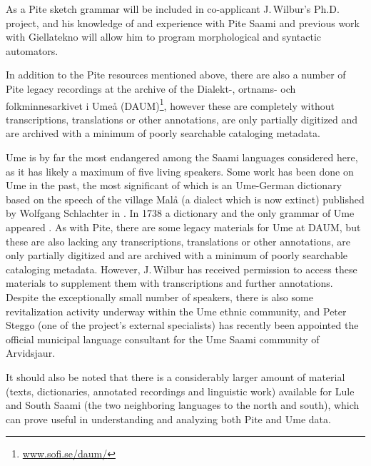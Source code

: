\documentclass[a4paper,12pt]{article}
\begin{document}
As a Pite sketch grammar will be included in co-applicant J.\,Wilbur's Ph.D. project, and his knowledge of and experience with Pite Saami and previous work with Giellatekno will allow him to program morphological and syntactic automators.

In addition to the Pite resources mentioned above, there are also a number of Pite legacy recordings at the archive of the Dialekt-, ortnams- och folkminnesarkivet i Umeå (DAUM)\footnote{\url{www.sofi.se/daum/}}, however these are completely without transcriptions, translations or other annotations, are only partially digitized and are archived with a minimum of poorly searchable cataloging metadata.

Ume is by far the most endangered among the Saami languages considered here, as it has likely a maximum of five living speakers. Some work has been done on Ume in the past, the most significant of which is an Ume-German dictionary based on the speech of the village Malå (a dialect which is now extinct) published by Wolfgang Schlachter in \citeyear{schlachter1958}. In 1738 a dictionary and the only grammar of Ume appeared \cite{fjellstrom1738a,fjellstrom1738b}.
As with Pite, there are some legacy materials for Ume at DAUM, but these are also lacking any transcriptions, translations or other annotations, are only partially digitized and are archived with a minimum of poorly searchable cataloging metadata. However, J.\,Wilbur has received permission to access these materials to supplement them with transcriptions and further annotations.
Despite the exceptionally small number of speakers, there is also some revitalization activity underway within the Ume ethnic community, and Peter Steggo (one of the project's external specialists) has recently been appointed the official municipal language consultant for the Ume Saami community of Arvidsjaur.

It should also be noted that there is a considerably larger amount of material (texts, dictionaries, annotated recordings and linguistic work)  available for Lule and South Saami (the two neighboring languages to the north and south), which can prove useful in understanding and analyzing both Pite and Ume data.
\end{document}
